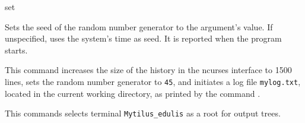 \begin{command}{set}{}
\begin{arguments}
            {Sets the seed of the random number generator to the argument's
            value. If unspecified, \poy uses the system's time as seed. It is
            reported when the program starts.}
            {}

	\end{arguments}


    \begin{poyexamples}
            {This command increases the size of the history in the ncurses
            interface to 1500 lines, sets the random number generator to \texttt{45},
            and initiates a log file \texttt{mylog.txt}, located in the current
            working directory, as printed by the command .}
            
            {This commands selects terminal \texttt{Mytilus\_edulis} as a root
            for output trees.}
            
     \end{poyexamples}
     
	\begin{poyalso}
	\end{poyalso}

\end{command}

